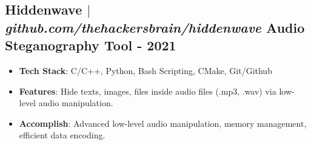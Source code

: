 \documentclass[11pt]{article}
\begin{document}
\subsection{Hiddenwave $|$ \normalfont\textit{github.com/thehackersbrain/hiddenwave} \hfill Audio Steganography Tool - \textbf{2021}}
\vspace{3pt}
\begin{itemize}
  \item \textbf{Tech Stack}: C/C++, Python, Bash Scripting, CMake, Git/Github
  \item \textbf{Features}: Hide texts, images, files inside audio files (.mp3, .wav) via low-level audio manipulation.
  \item \textbf{Accomplish}: Advanced low-level audio manipulation, memory management, efficient data encoding.
\end{itemize}
\end{document}
